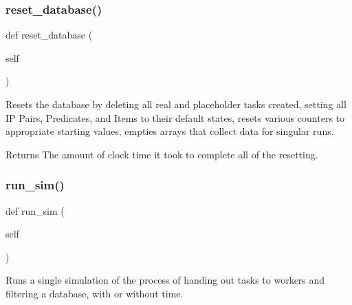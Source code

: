 \subsubsection{\texorpdfstring{reset\+\_\+database()}{reset\_database()}}
{\footnotesize\ttfamily def reset\+\_\+database (\begin{DoxyParamCaption}\item[{}]{self }\end{DoxyParamCaption})}



Resets the database by deleting all real and placeholder tasks created, setting all IP Pairs, Predicates, and Items to their default states, resets various counters to appropriate starting values, empties arrays that collect data for singular runs. 

\begin{DoxyReturn}{Returns}
The amount of clock time it took to complete all of the resetting. 
\end{DoxyReturn}
\mbox{\label{classdynamicfilterapp_1_1test__simulations_1_1_simulation_test_aafbc405f49645141a30302a448b056dc}} 
\subsubsection{\texorpdfstring{run\+\_\+sim()}{run\_sim()}}
{\footnotesize\ttfamily def run\+\_\+sim (\begin{DoxyParamCaption}\item[{}]{self }\end{DoxyParamCaption})}



Runs a single simulation of the process of handing out tasks to workers and filtering a database, with or without time. 


